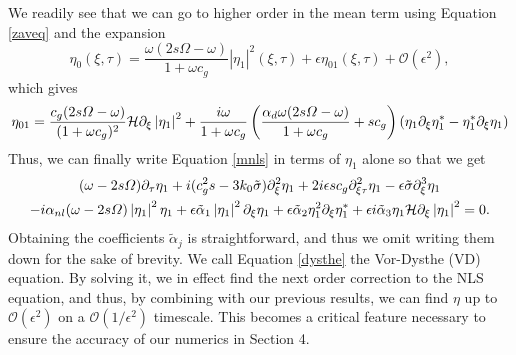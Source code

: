 \documentclass{JFM_Style/jfm}
\begin{document}
We readily see that we can go to higher order in the mean term using Equation \eqref{zaveq} and the expansion
\[
\eta_{0}(\xi,\tau) = \frac{\omega(2s\Omega-\omega)}{1+\omega c_{g}}\left|\eta_{1}\right|^{2}(\xi,\tau) + \epsilon \eta_{01}(\xi,\tau) + \mathcal{O}(\epsilon^{2}),
\]
which gives
\[
\eta_{01}= \frac{c_{g}(2s\varOmega-\omega)}{(1+\omega c_{g})^{2}}\mathcal{H}\partial_{\xi}\left|\eta_{1}\right|^{2} + \frac{i\omega}{1+\omega c_{g}}\left(\frac{\alpha_{d}\omega(2s\varOmega-\omega)}{1+\omega c_{g}} + s c_{g} \right) \left(\eta_{1}\partial_{\xi}\eta_{1}^{\ast} - \eta_{1}^{\ast}\partial_{\xi}\eta_{1} \right) 
\]
Thus, we can finally write Equation \eqref{mnls} in terms of $\eta_{1}$ alone so that we get 
\begin{multline}
(\omega-2s\varOmega)\partial_{\tau}\eta_{1} + i(c_{g}^{2}s-3k_{0}\tilde{\sigma})\partial_{\xi}^{2}\eta_{1} + 2i\epsilon s c_{g}\partial^{2}_{\xi\tau}\eta_{1} - \epsilon\tilde{\sigma} \partial^{3}_{\xi}\eta_{1} \\
- i \alpha_{nl}(\omega-2s\varOmega)\left|\eta_{1}\right|^{2}\eta_{1}
+ \epsilon \tilde{\alpha}_{1}\left|\eta_{1}\right|^{2}\partial_{\xi}\eta_{1}
+ \epsilon\tilde{\alpha}_{2}\eta_{1}^{2}\partial_{\xi}\eta^{\ast}_{1} + 
\epsilon i\tilde{\alpha}_{3}\eta_{1}\mathcal{H}\partial_{\xi}\left|\eta_{1}\right|^{2}= 0.
\label{dysthe}
\end{multline}
Obtaining the coefficients $\tilde{\alpha}_{j}$ is straightforward, and thus we omit writing them down for the sake of brevity.  We call Equation \eqref{dysthe} the Vor-Dysthe (VD) equation.  By solving it, we in effect find the next order correction to the NLS equation, and thus, by combining with our previous results, we can find $\eta$ up to $\mathcal{O}(\epsilon^{2})$ on a $\mathcal{O}(1/\epsilon^{2})$ timescale.  This becomes a critical feature necessary to ensure the accuracy of our numerics in Section 4.  
\end{document}
